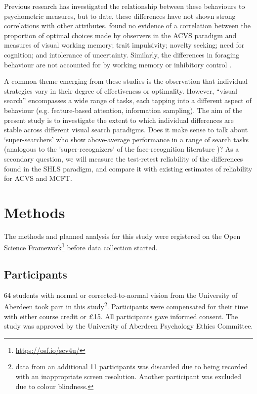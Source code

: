 \documentclass[a4paper, man, natbib, floatsintext]{apa6}
\begin{document}
Previous research has investigated the relationship between these behaviours to psychometric measures, but to date, these differences have not shown strong correlations with other attributes. \cite{irons-leber2016,irons-leber2018} found no evidence of a correlation between the proportion of optimal choices made by observers in the ACVS paradigm and measures of visual working memory; trait impulsivity; novelty seeking; need for cognition; and intolerance of uncertainty. Similarly, the differences in foraging behaviour are not accounted for by working memory or inhibitory control \citep{johannesson2017}. 

A common theme emerging from these studies is the observation that individual strategies vary in their degree of effectiveness or optimality. However, ``visual search'' encompasses a wide range of tasks, each tapping into a different aspect of behaviour (e.g. feature-based attention, information sampling). The aim of the present study is to investigate the extent to which individual differences are stable across different visual search paradigms. Does it make sense to talk about `super-searchers' who show above-average performance in a range of search tasks (analogous to the 'super-recognizers' of the face-recognition literature  \citep{russell2009})? As a secondary question, we will measure the test-retest reliability of the differences found in the SHLS paradigm, and compare it with existing estimates of reliability for ACVS and MCFT. 

\section{Methods}

The methods and planned analysis for this study were registered on the Open Science Framework\footnote{\url{https://osf.io/scv4u/}} before data collection started.

\subsection{Participants}
64 students with normal or corrected-to-normal vision from the University of Aberdeen took part in this study\footnote{data from an additional 11 participants was discarded due to being recorded with an inappropriate screen resolution. Another participant was excluded due to colour blindness.}. Participants were compensated for their time with either course credit or \pounds 15. All participants gave informed consent. The study was approved by the University of Aberdeen Psychology Ethics Committee. 
\end{document}
